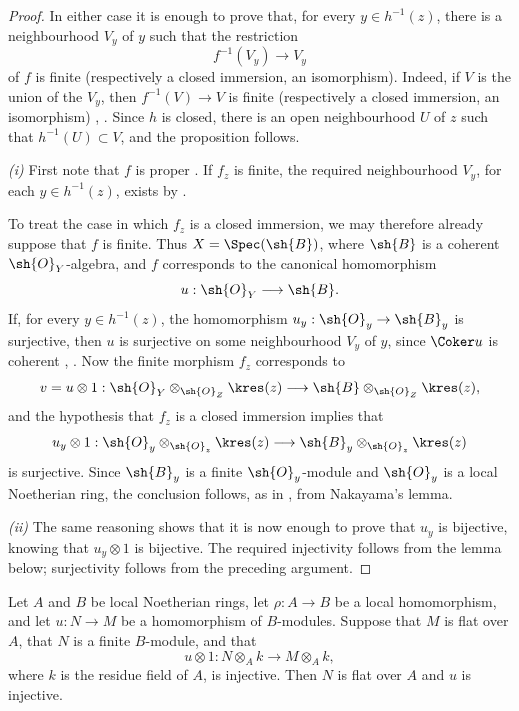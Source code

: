 \begin{proof}
In either case it is enough to prove that, for every
$y\in h^{-1}(z)$, there is a neighbourhood $V_y$ of $y$ such that
the restriction
\[
  f^{-1}(V_y)\longrightarrow V_y
\]
of $f$ is finite (respectively a closed immersion, an isomorphism).
Indeed, if $V$ is the union of the $V_y$, then
$f^{-1}(V)\to V$ is finite (respectively a closed immersion, an
isomorphism) , .  Since $h$ is
closed, there is an open neighbourhood $U$ of $z$ such that
$h^{-1}(U)\subset V$, and the proposition follows.

\noindent\textit{(i)} First note that $f$ is proper
.  If
$f_z$ is finite, the required neighbourhood $V_y$, for each
$y\in h^{-1}(z)$, exists by .


To treat the case in which $f_z$ is a closed immersion, we may
therefore already suppose that $f$ is finite.  Thus
$X=\Spec(\sh{B})$, where $\sh{B}$ is a coherent
$\sh{O}_Y$-algebra, and $f$ corresponds  to the
canonical homomorphism
\[
  u:\sh{O}_Y\longrightarrow\sh{B}.
\]
If, for every $y\in h^{-1}(z)$, the homomorphism
$u_y:\sh{O}_y\to\sh{B}_y$ is surjective, then $u$ is surjective on
some neighbourhood $V_y$ of $y$, since $\Coker u$ is coherent
, .  Now the finite morphism
$f_z$ corresponds to
\[
  v=u\otimes1:
  \sh{O}_Y\otimes_{\sh{O}_Z}\kres(z)
  \longrightarrow
  \sh{B}\otimes_{\sh{O}_Z}\kres(z),
\]
and the hypothesis that $f_z$ is a closed immersion implies that
\[
  u_y\otimes1:
  \sh{O}_y\otimes_{\sh{O}_z}\kres(z)
  \longrightarrow
  \sh{B}_y\otimes_{\sh{O}_z}\kres(z)
\]
is surjective.  Since $\sh{B}_y$ is a finite $\sh{O}_y$-module and
$\sh{O}_y$ is a local Noetherian ring, the conclusion follows, as
in , from Nakayama's lemma.

\noindent\textit{(ii)} The same reasoning shows that it is now
enough to prove
that $u_y$ is bijective, knowing that $u_y\otimes1$ is bijective.
The required injectivity follows from the lemma below; surjectivity
follows from the preceding argument.
\end{proof}

\begin{lemma}[4.6.7.1]
\label{III.4.6.7.1}
Let $A$ and $B$ be local Noetherian rings, let
$\rho:A\to B$ be a local homomorphism, and let $u:N\to M$ be a
homomorphism of $B$-modules.  Suppose that $M$ is flat over $A$,
that $N$ is a finite $B$-module, and that
\[
  u\otimes1:
  N\otimes_A k\longrightarrow M\otimes_A k,
\]
where $k$ is the residue field of $A$, is injective.  Then $N$ is
flat over $A$ and $u$ is injective.
\end{lemma}

